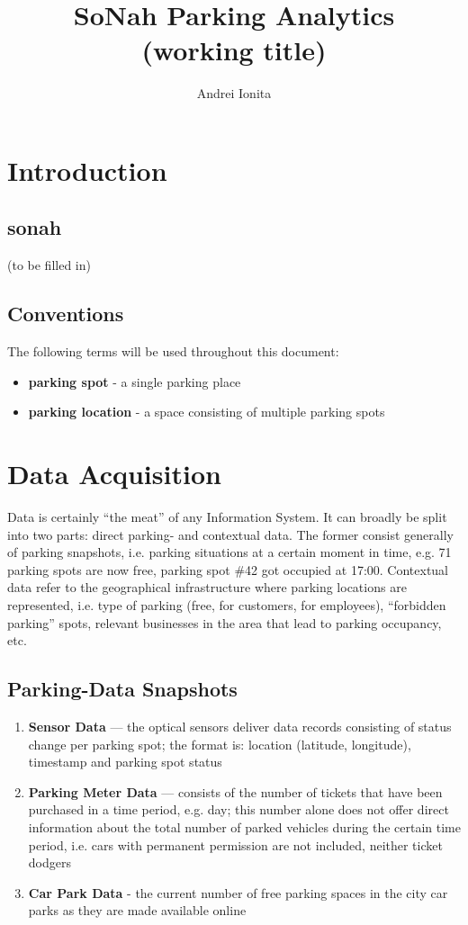 \documentclass{article}
\begin{document}
\title{SoNah Parking Analytics \\ \large (working title)}
\author{Andrei Ionita}

\maketitle

\section{Introduction}
\subsection{sonah}
(to be filled in)

\subsection{Conventions}
The following terms will be used throughout this document:
\begin{itemize}
\item \textbf{parking spot} - a single parking place
\item \textbf{parking location} - a space consisting of multiple parking spots
\end{itemize}

\section{Data Acquisition}
Data is certainly ``the meat'' of any Information System. It can broadly be split into two parts: direct parking- and contextual data. The former consist generally of parking snapshots, i.e. parking situations at a certain moment in time, e.g. 71 parking spots are now free, parking spot \#42 got occupied at 17:00. Contextual data refer to the geographical infrastructure where parking locations are represented, i.e. type of parking (free, for customers, for employees), ``forbidden parking'' spots, relevant businesses in the area that lead to parking occupancy, etc.

\subsection{Parking-Data Snapshots}
\label{parking-data-snapshots}
\begin{enumerate}
\item \textbf{Sensor Data} --- the optical sensors deliver data records consisting of status change per parking spot; the format is: location (latitude, longitude), timestamp and parking spot status
\item \textbf{Parking Meter Data} --- consists of the number of tickets that have been purchased in a time period, e.g. day; this number alone does not offer direct information about the total number of parked vehicles during the certain time period, i.e. cars with permanent permission are not included, neither ticket dodgers
\item \textbf{Car Park Data} - the current number of free parking spaces in the city car parks as they are made available online
\end{enumerate}
\end{document}

